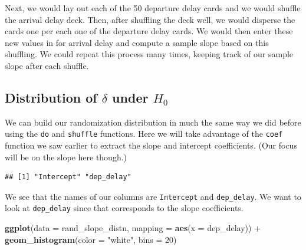 \documentclass[]{tufte-book}
\newenvironment{Shaded}{\begin{snugshade}}{\end{snugshade}}
\newcommand{\KeywordTok}[1]{\textcolor[rgb]{0.13,0.29,0.53}{\textbf{{#1}}}}
\newcommand{\DataTypeTok}[1]{\textcolor[rgb]{0.13,0.29,0.53}{{#1}}}
\newcommand{\DecValTok}[1]{\textcolor[rgb]{0.00,0.00,0.81}{{#1}}}
\newcommand{\StringTok}[1]{\textcolor[rgb]{0.31,0.60,0.02}{{#1}}}
\newcommand{\NormalTok}[1]{{#1}}
\theoremstyle{definition}
\theoremstyle{definition}
\theoremstyle{remark}
\begin{document}
Next, we would lay out each of the 50 departure delay cards and we would
shuffle the arrival delay deck. Then, after shuffling the deck well, we
would disperse the cards one per each one of the departure delay cards.
We would then enter these new values in for arrival delay and compute a
sample slope based on this shuffling. We could repeat this process many
times, keeping track of our sample slope after each shuffle.

\subsection{\texorpdfstring{Distribution of \(\delta\) under
\(H_0\)}{Distribution of \textbackslash{}delta under H\_0}}\label{distribution-of-delta-under-h_0-2}

We can build our randomization distribution in much the same way we did
before using the \texttt{do} and \texttt{shuffle} functions. Here we
will take advantage of the \texttt{coef} function we saw earlier to
extract the slope and intercept coefficients. (Our focus will be on the
slope here though.)

\begin{Shaded}
\end{Shaded}

\begin{verbatim}
## [1] "Intercept" "dep_delay"
\end{verbatim}

We see that the names of our columns are \texttt{Intercept} and
\texttt{dep\_delay}. We want to look at \texttt{dep\_delay} since that
corresponds to the slope coefficients.

\begin{Shaded}
\begin{Highlighting}[]
\KeywordTok{ggplot}\NormalTok{(}\DataTypeTok{data =} \NormalTok{rand_slope_distn, }\DataTypeTok{mapping =} \KeywordTok{aes}\NormalTok{(}\DataTypeTok{x =} \NormalTok{dep_delay)) +}
\StringTok{  }\KeywordTok{geom_histogram}\NormalTok{(}\DataTypeTok{color =} \StringTok{"white"}\NormalTok{, }\DataTypeTok{bins =} \DecValTok{20}\NormalTok{)}
\end{Highlighting}
\end{Shaded}
\end{document}
